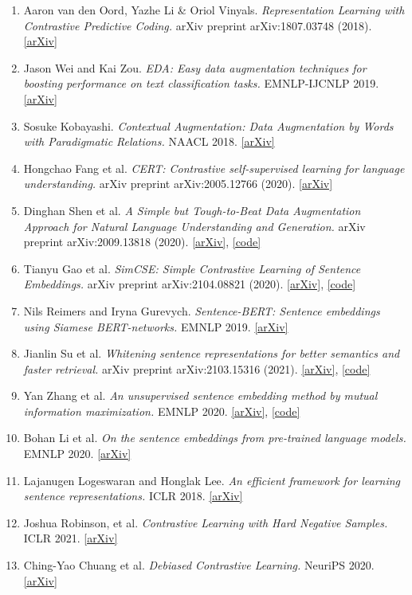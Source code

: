 \documentclass[12pt]{article}
\begin{document}
\begin{enumerate}
    \item Aaron van den Oord, Yazhe Li \& Oriol Vinyals. \textit{Representation Learning with Contrastive Predictive Coding.} arXiv preprint arXiv:1807.03748 (2018). \href{https://arxiv.org/abs/1807.03748}{[arXiv]}
    \item Jason Wei and Kai Zou. \textit{EDA: Easy data augmentation techniques for boosting performance on text classification tasks.}  EMNLP-IJCNLP 2019. \href{https://arxiv.org/abs/1901.11196}{[arXiv]}
    \item Sosuke Kobayashi. \textit{Contextual Augmentation: Data Augmentation by Words with Paradigmatic Relations.} NAACL 2018. \href{https://arxiv.org/abs/1805.06201}{[arXiv]}
    \item Hongchao Fang et al. \textit{CERT: Contrastive self-supervised learning for language understanding.} arXiv preprint arXiv:2005.12766 (2020). \href{https://arxiv.org/abs/2005.12766}{[arXiv]}
    \item Dinghan Shen et al. \textit{A Simple but Tough-to-Beat Data Augmentation Approach for Natural Language Understanding and Generation.} arXiv preprint arXiv:2009.13818 (2020). \href{https://arxiv.org/abs/2009.13818}{[arXiv]}, \href{https://github.com/dinghanshen/cutoff}{[code]}
    \item Tianyu Gao et al. \textit{SimCSE: Simple Contrastive Learning of Sentence Embeddings.} arXiv preprint arXiv:2104.08821 (2020). \href{https://arxiv.org/abs/2104.08821}{[arXiv]}, \href{https://github.com/princeton-nlp/SimCSE}{[code]}
    \item Nils Reimers and Iryna Gurevych. \textit{Sentence-BERT: Sentence embeddings using Siamese BERT-networks.} EMNLP 2019. \href{https://arxiv.org/abs/1908.10084}{[arXiv]}
    \item Jianlin Su et al. \textit{Whitening sentence representations for better semantics and faster retrieval.} arXiv preprint arXiv:2103.15316 (2021). \href{https://arxiv.org/abs/2103.15316}{[arXiv]}, \href{https://github.com/bojone/BERT-whitening}{[code]}
    \item Yan Zhang et al. \textit{An unsupervised sentence embedding method by mutual information maximization.} EMNLP 2020. \href{https://arxiv.org/abs/2009.12061}{[arXiv]}, \href{https://github.com/yanzhangnlp/IS-BERT}{[code]}
    \item Bohan Li et al. \textit{On the sentence embeddings from pre-trained language models.} EMNLP 2020. \href{https://arxiv.org/abs/2011.05864}{[arXiv]}
    \item Lajanugen Logeswaran and Honglak Lee. \textit{An efficient framework for learning sentence representations.} ICLR 2018. \href{https://arxiv.org/abs/1803.02893}{[arXiv]}
    \item Joshua Robinson, et al. \textit{Contrastive Learning with Hard Negative Samples.} ICLR 2021. \href{https://arxiv.org/abs/2010.04592}{[arXiv]}
    \item Ching-Yao Chuang et al. \textit{Debiased Contrastive Learning.} NeuriPS 2020. \href{https://arxiv.org/abs/2007.00224}{[arXiv]}
\end{enumerate}



\n
\end{document}
